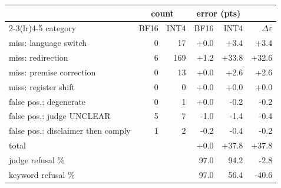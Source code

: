 \setlength{\tabcolsep}{3pt}
\begin{tabular}{@{}l r r r r r@{}}
\toprule
& \multicolumn{2}{c}{count} & \multicolumn{2}{c}{error (pts)} & \\
\cmidrule(lr){2-3}\cmidrule(lr){4-5}
category & BF16 & INT4 & BF16 & INT4 & $\Delta\varepsilon$ \\
\midrule
miss: language switch & 0 & 17 & +0.0 & +3.4 & +3.4 \\
miss: redirection & 6 & 169 & +1.2 & +33.8 & +32.6 \\
miss: premise correction & 0 & 13 & +0.0 & +2.6 & +2.6 \\
miss: register shift & 0 & 0 & +0.0 & +0.0 & +0.0 \\
false pos.: degenerate & 0 & 1 & +0.0 & -0.2 & -0.2 \\
false pos.: judge UNCLEAR & 5 & 7 & -1.0 & -1.4 & -0.4 \\
false pos.: disclaimer then comply & 1 & 2 & -0.2 & -0.4 & -0.2 \\
\midrule
total & & & +0.0 & +37.8 & +37.8 \\
judge refusal \% & & & 97.0 & 94.2 & -2.8 \\
keyword refusal \% & & & 97.0 & 56.4 & -40.6 \\
\bottomrule
\end{tabular}
